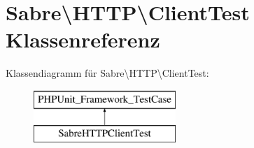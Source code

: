 \hypertarget{class_sabre_1_1_h_t_t_p_1_1_client_test}{}\section{Sabre\textbackslash{}H\+T\+TP\textbackslash{}Client\+Test Klassenreferenz}
\label{class_sabre_1_1_h_t_t_p_1_1_client_test}
Klassendiagramm für Sabre\textbackslash{}H\+T\+TP\textbackslash{}Client\+Test\+:\begin{figure}[H]
\begin{center}
\leavevmode
\includegraphics[height=2.000000cm]{class_sabre_1_1_h_t_t_p_1_1_client_test}
\end{center}
\end{figure}
